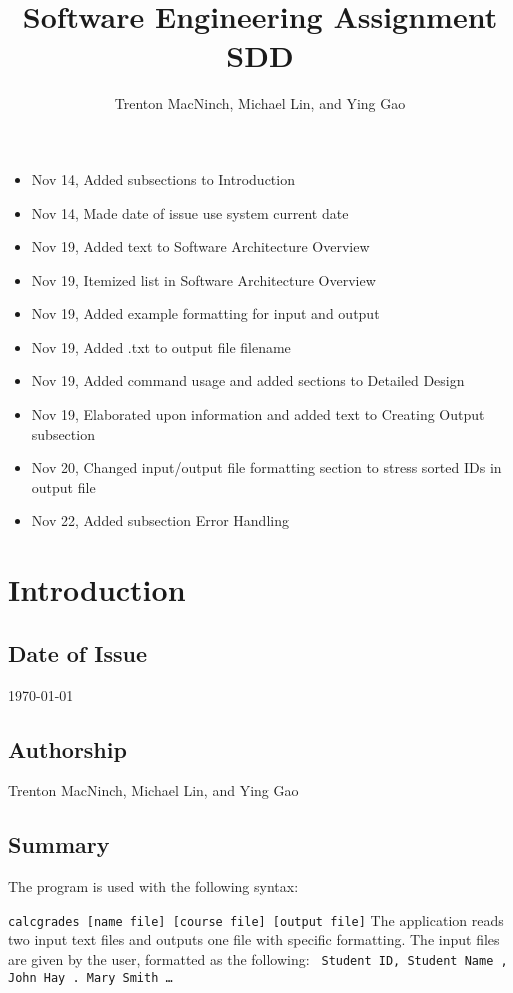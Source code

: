 \documentclass{article}
\title{\textbf{Software Engineering Assignment SDD}}
\author{Trenton MacNinch, Michael Lin, and Ying Gao}
\begin{document}
\maketitle
\newpage

\tableofcontents
\newpage

\begin{itemize}
\item Nov 14, Added subsections to Introduction
\item Nov 14, Made date of issue use system current date
\item Nov 19, Added text to Software Architecture Overview
\item Nov 19, Itemized list in Software Architecture Overview
\item Nov 19, Added example formatting for input and output
\item Nov 19, Added .txt to output file filename
\item Nov 19, Added command usage and added sections to Detailed Design
\item Nov 19, Elaborated upon information and added text to Creating Output subsection
\item Nov 20, Changed input/output file formatting section to stress sorted IDs in output file
\item Nov 22, Added subsection Error Handling
\end{itemize}

\section{Introduction}
\subsection{Date of Issue}
\today
\subsection{Authorship}
Trenton MacNinch, Michael Lin, and Ying Gao
\subsection{Summary}
The program is used with the following syntax:

\texttt{calcgrades [name file] [course file] [output file]}
\newline \newline
The application reads two input text files and outputs one file with specific formatting.
The input files are given by the user, formatted as the following:
\texttt{  \newline
  Student ID, Student Name , John Hay . Mary Smith \newline
  \ldots
}
\end{document}
